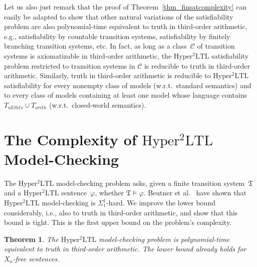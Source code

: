 \documentclass[dvipsnames,10pt,a4paper]{amsart}
\newtheorem{thm}{Theorem}[section]
\theoremstyle{definition}
\theoremstyle{remark}
\renewcommand{\phi}{\varphi}
\newcommand{\sohyltl}{\mathrm{Hyper^2LTL}\xspace}
\newcommand{\univar}{X_a}
\newcommand{\tsys}{\mathfrak{T}}
\newcommand{\allsets}{{\mathit{allSets}}}
\newcommand{\arith}{\mathit{arith}}
\newcommand{\class}{\mathcal{C}}
\begin{document}
Let us also just remark that the proof of Theorem~\ref{thm_finsatcomplexity} can easily be adapted to show that other natural variations of the satisfiability problem are also polynomial-time equivalent to  truth in third-order arithmetic, e.g., satisfiability by countable transition systems, satisfiability by finitely branching transition systems, etc.
In fact, as long as a class~$\class$ of transition systems is axiomatizable in third-order arithmetic, the $\sohyltl$ satisfiability problem restricted to transition systems in $\class$ is reducible to truth in third-order arithmetic.
Similarly, truth in third-order arithmetic is reducible to $\sohyltl$ satisfiability for every nonempty class of models (w.r.t.\ standard semantics) and to every class of models containing at least one model whose language contains $T_\allsets \cup T_\arith$ (w.r.t.\ closed-world semantics).

\section{\texorpdfstring{The Complexity of $\sohyltl$ Model-Checking}{The Complexity of Second-order HyperLTL Model-Checking}}
\label{sec_mc}

The $\sohyltl$ model-checking problem asks, given a finite transition system~$\tsys$ and a $\sohyltl$ sentence~$\phi$, whether $\tsys \models \phi$.
Beutner et al.~\cite{DBLP:conf/cav/BeutnerFFM23} have shown that $\sohyltl$ model-checking is $\Sigma_1^1$-hard. 
We improve the lower bound considerably, i.e., also to truth in third-order arithmetic, and show that this bound is tight.
This is the first upper bound on the problem's complexity. 


\begin{thm}
\label{thm_mccomplexity}
The $\sohyltl$ model-checking problem is polynomial-time equivalent to truth in third-order arithmetic. The lower bound already holds for $\univar$-free sentences.
\end{thm}
\end{document}
